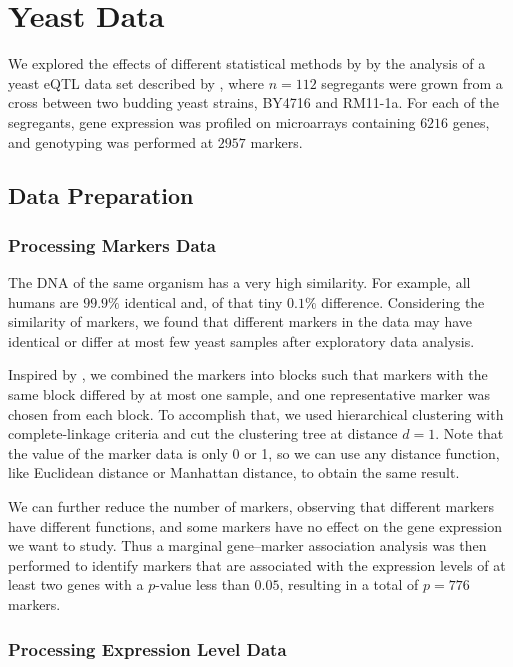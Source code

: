 \section{Yeast Data}

We explored the effects of different statistical methods by by the analysis of a yeast eQTL data set described by \citet{brem2005landscape}, where $n = 112$ segregants were grown from a cross between two budding yeast strains, BY4716 and RM11-1a. 
For each of the segregants, gene expression was profiled on microarrays containing $6216$ genes, and genotyping was performed at $2957$ markers. 


\subsection{Data Preparation}

\subsubsection{Processing Markers Data}

The DNA of the same organism has a very high similarity. 
For example, all humans are $99.9\%$ identical and, of that tiny $0.1\%$ difference. 
Considering the similarity of markers, we found that different markers in the data may have identical or differ at most few yeast samples after exploratory data analysis. 

Inspired by \citet{yin2011sparse}, we combined the markers into blocks such that markers with the same block differed by at most one sample, and one representative marker was chosen from each block. 
To accomplish that, we used hierarchical clustering with complete-linkage criteria and cut the clustering tree at distance $d=1$. 
Note that the value of the marker data is only 0 or 1, so we can use any distance function, like Euclidean distance or Manhattan distance, to obtain the same result.

We can further reduce the number of markers, observing that different markers have different functions, and some markers have no effect on the gene expression we want to study. 
Thus a marginal gene–marker association analysis was then performed to identify markers that are associated with the expression levels of at least two genes with a $p$-value less than $0.05$, resulting in a total of $p = 776$ markers. 

\subsubsection{Processing Expression Level Data}